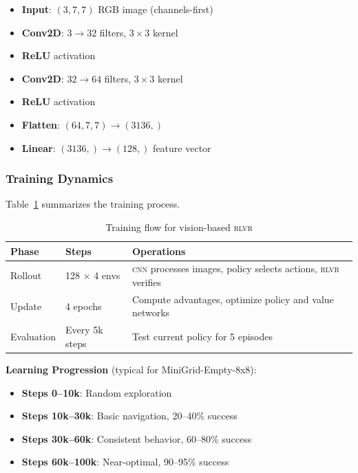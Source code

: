 \documentclass[11pt,a4paper]{article}
\newcommand{\rlvr}{\textsc{rlvr}}
\newcommand{\cnn}{\textsc{cnn}}
\begin{document}
\begin{itemize}[leftmargin=*]
    \item \textbf{Input}: $(3, 7, 7)$ RGB image (channels-first)
    \item \textbf{Conv2D}: $3 \rightarrow 32$ filters, $3 \times 3$ kernel
    \item \textbf{ReLU} activation
    \item \textbf{Conv2D}: $32 \rightarrow 64$ filters, $3 \times 3$ kernel
    \item \textbf{ReLU} activation
    \item \textbf{Flatten}: $(64, 7, 7) \rightarrow (3136,)$
    \item \textbf{Linear}: $(3136,) \rightarrow (128,)$ feature vector
\end{itemize}

\subsubsection{Training Dynamics}

Table~\ref{tab:training_flow} summarizes the training process.

\begin{table}[t]
\centering
\caption{Training flow for vision-based \rlvr{}}
\label{tab:training_flow}
\small
\begin{tabular}{@{}llp{5cm}@{}}
\toprule
\textbf{Phase} & \textbf{Steps} & \textbf{Operations} \\
\midrule
Rollout & 128 $\times$ 4 envs & \cnn{} processes images, policy selects actions, \rlvr{} verifies \\
Update & 4 epochs & Compute advantages, optimize policy and value networks \\
Evaluation & Every 5k steps & Test current policy for 5 episodes \\
\bottomrule
\end{tabular}
\end{table}

\textbf{Learning Progression} (typical for MiniGrid-Empty-8x8):
\begin{itemize}[leftmargin=*]
    \item \textbf{Steps 0--10k}: Random exploration
    \item \textbf{Steps 10k--30k}: Basic navigation, 20--40\% success
    \item \textbf{Steps 30k--60k}: Consistent behavior, 60--80\% success
    \item \textbf{Steps 60k--100k}: Near-optimal, 90--95\% success
\end{itemize}
\end{document}
